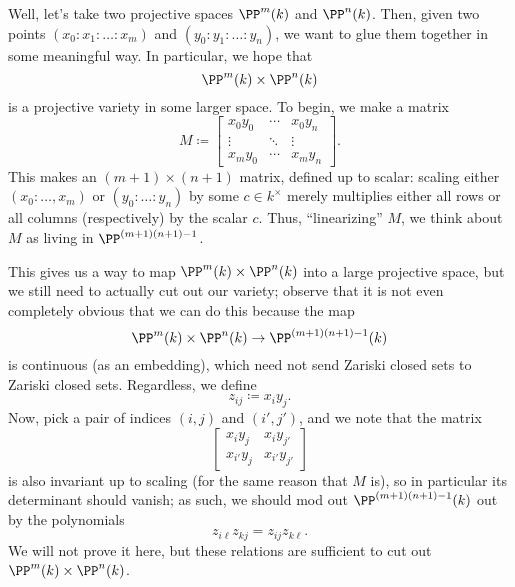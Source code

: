 Well, let's take two projective spaces $\PP^m(k)$ and $\PP^n(k)$. Then, given two points $(x_0:x_1:\ldots:x_m)$ and $(y_0:y_1:\ldots:y_n)$, we want to glue them together in some meaningful way. In particular, we hope that
\[\PP^m(k)\times\PP^n(k)\]
is a projective variety in some larger space. To begin, we make a matrix
\[M\coloneqq\begin{bmatrix}
	x_0y_0 & \cdots & x_0y_n \\
	\vdots & \ddots & \vdots \\
	x_my_0 & \cdots & x_my_n
\end{bmatrix}.\]
This makes an $(m+1)\times(n+1)$ matrix, defined up to scalar: scaling either $(x_0:\ldots,x_m)$ or $(y_0:\ldots:y_n)$ by some $c\in k^\times$ merely multiplies either all rows or all columns (respectively) by the scalar $c$. Thus, ``linearizing'' $M$, we think about $M$ as living in $\PP^{(m+1)(n+1)-1}$.

This gives us a way to map $\PP^m(k)\times\PP^n(k)$ into a large projective space, but we still need to actually cut out our variety; observe that it is not even completely obvious that we can do this because the map
\[\PP^m(k)\times\PP^n(k)\to\PP^{(m+1)(n+1)-1}(k)\]
is continuous (as an embedding), which need not send Zariski closed sets to Zariski closed sets.
Regardless, we define
\[z_{ij}\coloneqq x_iy_j.\]
Now, pick a pair of indices $(i,j)$ and $(i',j')$, and we note that the matrix
\[\begin{bmatrix}
	x_iy_j & x_iy_{j'} \\
	x_{i'}y_j & x_{i'}y_{j'}
\end{bmatrix}\]
is also invariant up to scaling (for the same reason that $M$ is), so in particular its determinant should vanish; as such, we should mod out $\PP^{(m+1)(n+1)-1}(k)$ out by the polynomials
\[z_{i\ell}z_{kj}=z_{ij}z_{k\ell}.\]
We will not prove it here, but these relations are sufficient to cut out $\PP^m(k)\times\PP^n(k)$.


